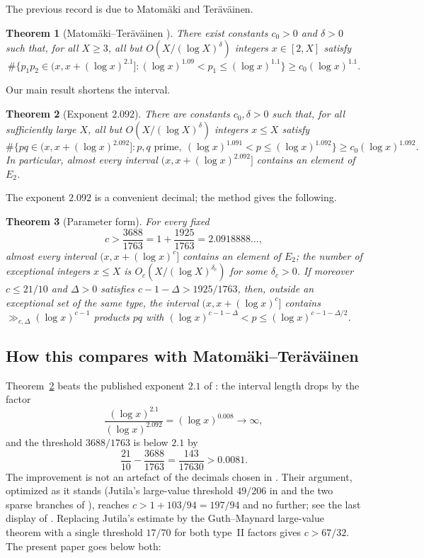 \documentclass[11pt,a4paper]{amsart}
\newtheorem{theorem}{Theorem}[section]
\theoremstyle{definition}
\newcommand{\1}{\mathbf 1}
\newcommand{\Etwo}{E_2}
\begin{document}
The previous record is due to Matom\"aki and Ter\"av\"ainen.

\begin{theorem}[{Matom\"aki--Ter\"av\"ainen \cite[Theorem~1.1]{MT}}]
\label{thm:MT}
There exist constants \(c_0>0\) and \(\delta>0\) such that, for all
\(X\ge3\), all but \(O(X/(\log X)^\delta)\) integers \(x\in[2,X]\)
satisfy
\[
 \#\bigl\{p_1p_2\in(x,x+(\log x)^{2.1}]:
 (\log x)^{1.09}<p_1\le(\log x)^{1.1}\bigr\}
 \ge c_0(\log x)^{1.1}.
\]
\end{theorem}

Our main result shortens the interval.

\begin{theorem}[Exponent \(2.092\)]\label{thm:clean}
There are constants \(c_0,\delta>0\) such that, for all sufficiently
large \(X\), all but \(O(X/(\log X)^\delta)\) integers \(x\le X\)
satisfy
\[
 \#\bigl\{pq\in(x,x+(\log x)^{2.092}]:
 p,q\text{ prime},\ (\log x)^{1.091}<p\le(\log x)^{1.092}\bigr\}
 \ge c_0(\log x)^{1.092}.
\]
In particular, almost every interval \((x,x+(\log x)^{2.092}]\)
contains an element of \(\Etwo\).
\end{theorem}

The exponent \(2.092\) is a convenient decimal; the method gives the
following.

\begin{theorem}[Parameter form]\label{thm:parameter}
For every fixed
\[
 c>\frac{3688}{1763}=1+\frac{1925}{1763}=2.0918888\ldots,
\]
almost every interval \((x,x+(\log x)^c]\) contains an element of
\(\Etwo\); the number of exceptional integers \(x\le X\) is
\(O_c(X/(\log X)^{\delta_c})\) for some \(\delta_c>0\).  If moreover
\(c\le21/10\) and \(\Delta>0\) satisfies \(c-1-\Delta>1925/1763\), then,
outside an exceptional set of the same type, the interval
\((x,x+(\log x)^c]\) contains \(\gg_{c,\Delta}(\log x)^{c-1}\) products
\(pq\) with \((\log x)^{c-1-\Delta}<p\le(\log x)^{c-1-\Delta/2}\).
\end{theorem}

\subsection*{How this compares with Matom\"aki--Ter\"av\"ainen}
Theorem~\ref{thm:clean} beats the published exponent \(2.1\) of
\cite[Theorem~1.1]{MT}: the interval length drops by the factor
\[
 \frac{(\log x)^{2.1}}{(\log x)^{2.092}}=(\log x)^{0.008}\longrightarrow\infty ,
\]
and the threshold \(3688/1763\) is below \(2.1\) by
\[
 \frac{21}{10}-\frac{3688}{1763}=\frac{143}{17630}>0.0081 .
\]
The improvement is not an artefact of the decimals chosen in \cite{MT}.
Their argument, optimized as it stands (Jutila's large-value threshold
\(49/206\) in \cite[Lemma~4.1]{MT} and the two sparse branches of
\cite[Section~5.3]{MT}), reaches \(c>1+103/94=197/94\) and no further;
see the last display of \cite[Section~5.3]{MT}.  Replacing Jutila's
estimate by the Guth--Maynard large-value theorem with a single threshold
\(17/70\) for both type~II factors gives \(c>67/32\).  The present paper
goes below both:
\end{document}
